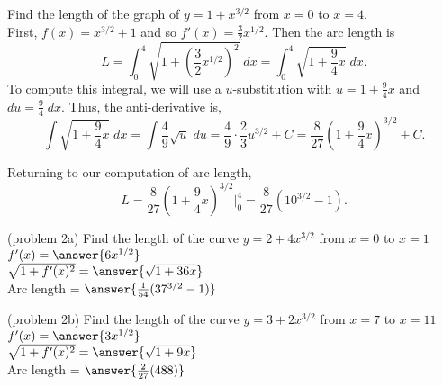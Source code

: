 \documentclass{ximera}
\begin{document}
\begin{example}[example 2]
 Find the length of the graph of 
$y = 1+ x^{3/2}$ 
from  $x = 0$ to $x = 4$.\\
First, $f(x) = x^{3/2} + 1$ and so $f'(x) = \frac32 x^{1/2}$. 
Then the arc length is
\[
L = \int_0^4 \sqrt{1 + \left(\frac32 x^{1/2}\right)^2} \; dx = \int_0^4 \sqrt{1 + \frac94 x} \;dx.
\]
To compute this integral, we will use a $u$-substitution with $u = 1+\frac94 x$ and $du = \frac94 \; dx$.
Thus, the anti-derivative is,
\[
\int \sqrt{1+\frac94 x} \; dx = \int \frac49 \sqrt u \; du = \frac49 \cdot \frac23 u^{3/2} + C = \frac{8}{27} \left(1 + \frac94 x \right)^{3/2} + C.
\]

Returning to our computation of arc length, 
\[
L = \frac{8}{27} \left(1 + \frac94 x \right)^{3/2} \bigg|_0^4 = \frac{8}{27} (10^{3/2} - 1).
\]
\end{example}


\begin{problem}(problem 2a)
Find the length of the curve $y = 2 + 4x^{3/2}$ from $x = 0$ to $x = 1$\\

$f'(x) = \answer{6x^{1/2}}$\\

$\sqrt{1+f'(x)^2} = \answer{\sqrt{1+ 36x}}$\\

Arc length = $\answer{\frac{1}{54} (37^{3/2} -1)}$
\end{problem}



\begin{problem}(problem 2b)
Find the length of the curve $y = 3 + 2x^{3/2}$ from $x = 7$ to $x = 11$\\

$f'(x) = \answer{3x^{1/2}}$\\

$\sqrt{1+f'(x)^2} = \answer{\sqrt{1+ 9x}}$\\

Arc length = $\answer{\frac{2}{27} (488)}$
\end{problem}
\end{document}
